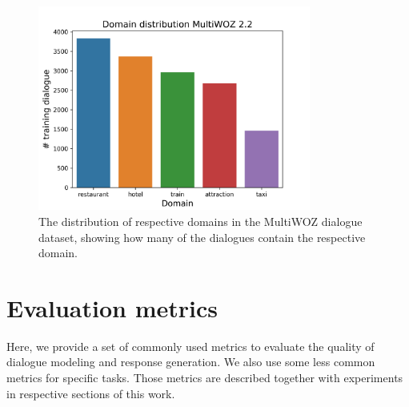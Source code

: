 \begin{figure}[ht]
    \centering
    \includegraphics[width=0.8\textwidth]{images/multiwoz-distribution.png}
    \caption{The distribution of respective domains in the MultiWOZ dialogue dataset, showing how many of the dialogues contain the respective domain.}
    \label{02:fig:mw-dist}
\end{figure}


\section{Evaluation metrics}
\label{02:sec:eval_metrics}
Here, we provide a set of commonly used metrics to evaluate the quality of dialogue modeling and response generation.
We also use some less common metrics for specific tasks.
Those metrics are described together with experiments in respective sections of this work.
